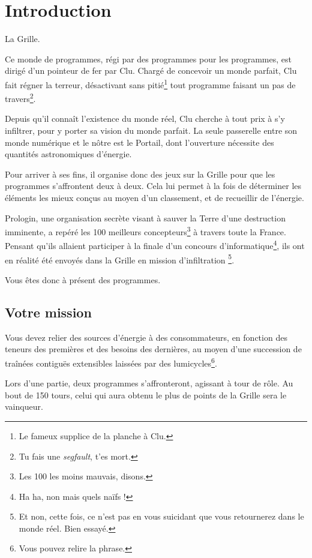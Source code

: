\section{Introduction}

La Grille.

Ce monde de programmes, régi par des programmes pour les programmes,
est dirigé d'un pointeur de fer par Clu. Chargé de concevoir un monde
parfait, Clu fait régner la terreur, désactivant sans pitié\footnote{Le fameux supplice de la planche à Clu.} tout programme faisant un pas de travers\footnote{Tu fais une \emph{segfault}, t'es mort.}.

Depuis qu'il connaît l'existence du monde réel, Clu cherche à tout prix à s'y infiltrer, pour y porter sa vision du monde parfait. La seule passerelle entre son monde numérique et le nôtre est le Portail, dont l'ouverture nécessite des quantités astronomiques d'énergie.

Pour arriver à ses fins, il organise donc des jeux sur la Grille pour que les programmes s'affrontent deux à deux. Cela lui permet à la fois de déterminer les éléments les mieux conçus au moyen d'un classement, et de recueillir de l'énergie.

Prologin, une organisation secrète visant à sauver la Terre d'une destruction imminente, a repéré les 100 meilleurs concepteurs\footnote{Les 100 les moins mauvais, disons.} à travers toute la France. Pensant qu'ils allaient participer à la finale d'un concours d'informatique\footnote{Ha ha, non mais quels naïfs !}, ils ont en réalité été envoyés dans la Grille en mission d'infiltration \footnote{Et non, cette fois, ce n'est pas en vous suicidant que vous retournerez dans le monde réel. Bien essayé.}.

Vous êtes donc à présent des programmes.

\newpage

        \subsection{Votre mission}

Vous devez relier des sources d'énergie à des consommateurs, en fonction des teneurs des premières et des besoins des dernières, au moyen d'une succession de traînées contiguës extensibles laissées par des lumicycles\footnote{Vous pouvez relire la phrase.}.

Lors d'une partie, deux programmes s'affronteront, agissant à tour de rôle. Au bout de 150 tours, celui qui aura obtenu le plus de points de la Grille sera le vainqueur.

